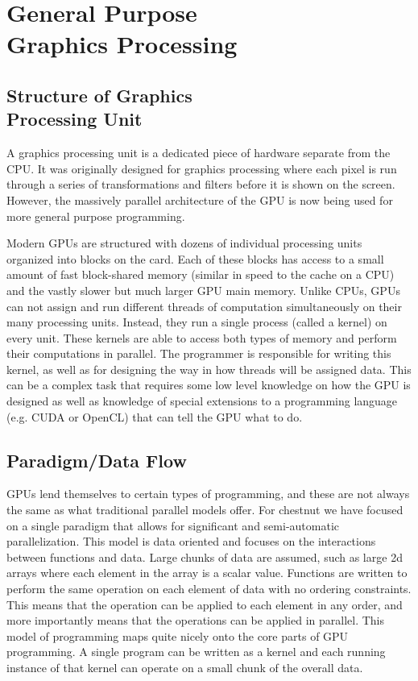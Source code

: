 \documentclass[twocolumn]{article}
\renewcommand{\|}{\origbar} %
\begin{document}
\section{General Purpose \\ Graphics Processing}
\label{sec:GPGP}

\subsection{Structure of Graphics \\ Processing Unit}

A graphics processing unit is a dedicated piece of hardware separate from the CPU. It was originally designed for graphics processing where each pixel is run through a series of transformations and filters before it is shown on the screen. However, the massively parallel architecture of the GPU is now being used for more general purpose programming. 

Modern GPUs are structured with dozens of individual processing units organized into blocks on the card. Each of these blocks has access to a small amount of fast block-shared memory (similar in speed to the cache on a CPU) and the vastly slower but much larger GPU main memory. Unlike CPUs, GPUs can not assign and run different threads of computation simultaneously on their many processing units. Instead, they run a single process (called a kernel) on every unit. These kernels are able to access both types of memory and perform their computations in parallel. The programmer is responsible for writing this kernel, as well as for designing the way in how threads will be assigned data. This can be a complex task that requires some low level knowledge on how the GPU is designed as well as knowledge of special extensions to a programming language (e.g. CUDA or OpenCL) that can tell the GPU what to do.

\subsection{Paradigm/Data Flow}

GPUs lend themselves to certain types of programming, and these are not always the same as what traditional parallel models offer. For chestnut we have focused on a single paradigm that allows for significant and semi-automatic parallelization. This model is data oriented and focuses on the interactions between functions and data. Large chunks of data are assumed, such as large 2d arrays where each element in the array is a scalar value. Functions are written to perform the same operation on each element of data with no ordering constraints. This means that the operation can be applied to each element in any order, and more importantly means that the operations can be applied in parallel. This model of programming maps quite nicely onto the core parts of GPU programming. A single program can be written as a kernel and each running instance of that kernel can operate on a small chunk of the overall data.
\end{document}
